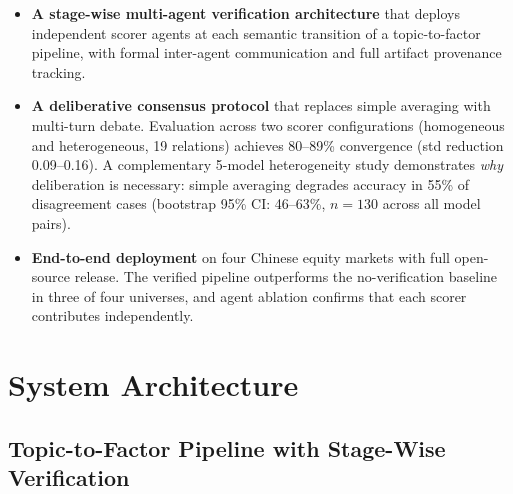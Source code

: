 \documentclass[sigconf]{acmart}
\begin{document}
\begin{itemize}
    \item \textbf{A stage-wise multi-agent verification architecture} that deploys independent scorer agents at each semantic transition of a topic-to-factor pipeline, with formal inter-agent communication and full artifact provenance tracking.
    \item \textbf{A deliberative consensus protocol} that replaces simple averaging with multi-turn debate. Evaluation across two scorer configurations (homogeneous and heterogeneous, 19 relations) achieves 80--89\% convergence (std reduction 0.09--0.16). A complementary 5-model heterogeneity study demonstrates \emph{why} deliberation is necessary: simple averaging degrades accuracy in 55\% of disagreement cases (bootstrap 95\% CI: 46--63\%, $n{=}130$ across all model pairs).
    \item \textbf{End-to-end deployment} on four Chinese equity markets with full open-source release. The verified pipeline outperforms the no-verification baseline in three of four universes, and agent ablation confirms that each scorer contributes independently.
\end{itemize}

\section{System Architecture}

\subsection{Topic-to-Factor Pipeline with Stage-Wise Verification}
\end{document}

